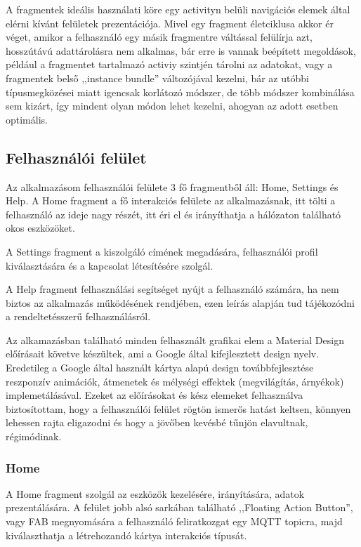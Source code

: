 \documentclass[
]{thesis-ekf}
\theoremstyle{definition}
\theoremstyle{remark}
\begin{document}
A fragmentek ideális használati köre egy activityn belüli navigációs elemek által elérni kívánt felületek prezentációja. Mivel egy fragment életciklusa akkor ér véget, amikor a felhasználó egy másik fragmentre váltással felülírja azt, hosszútávú
adattárolásra nem alkalmas, bár erre is vannak beépített megoldások, például a fragmentet tartalmazó activiy szintjén tárolni
az adatokat, vagy a fragmentek belső ,,instance bundle'' változójával kezelni, bár az utóbbi típusmegközései miatt igencsak
korlátozó módszer, de több módszer kombinálása sem kizárt, így mindent olyan módon lehet kezelni, ahogyan az adott esetben optimális.
\subsection{Felhasználói felület}
Az alkalmazásom felhasználói felülete 3 fő fragmentből áll: Home, Settings és Help. A Home fragment a fő interakciós felülete
az alkalmazásnak, itt tölti a felhasználó az ideje nagy részét, itt éri el és irányíthatja a hálózaton található okos eszközöket.

A Settings fragment a kiszolgáló címének megadására, felhasználói profil kiválasztására és a kapcsolat létesítésére
szolgál.

A Help fragment felhasználási segítséget nyújt a felhasználó számára, ha nem biztos az alkalmazás működésének rendjében,
ezen leírás alapján tud tájékozódni a rendeltetésszerű felhasználásról.

Az alkamazásban található minden felhasznált grafikai elem a Material Design\cite{material} előírásait követve készültek,
ami a Google által kifejlesztett design nyelv. Eredetileg a Google által használt kártya alapú design továbbfejlesztése
reszponzív animációk, átmenetek és mélységi effektek (megvilágítás, árnyékok) implemetálásával. Ezeket az előírásokat és
kész elemeket felhasználva biztosítottam, hogy a felhasználói felület rögtön ismerős hatást keltsen, könnyen lehessen rajta
eligazodni és hogy a jövőben kevésbé tűnjön elavultnak, régimódinak.


\subsubsection{Home}
A Home fragment szolgál az eszközök kezelésére, irányítására, adatok prezentálására.
A felület jobb alsó sarkában található ,,Floating Action Button'', vagy FAB megnyomására a felhasználó feliratkozgat egy MQTT
topicra, majd kiválaszthatja a létrehozandó kártya interakciós típusát. 
\end{document}
